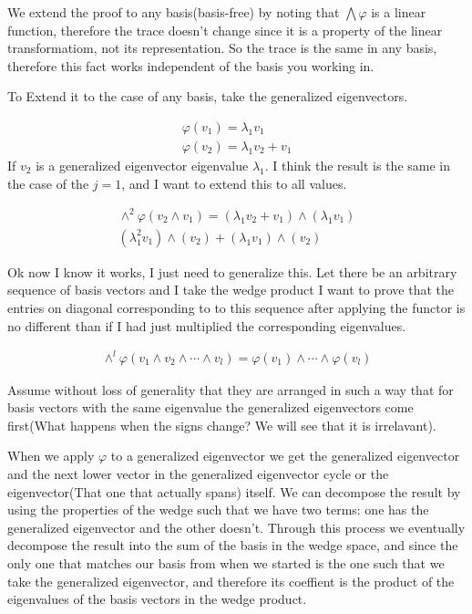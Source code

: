 \documentclass[11pt]{article}
\newcommand\0{\mathbf{0}}
\newcommand\<{\langle}
\renewcommand\>{\rangle}
\begin{document}
\begin{enumerate}
We extend the proof to any basis(basis-free) by noting that $\bigwedge \varphi$ is a linear function, therefore the 
trace doesn't change since it is a property of the linear transformatiom, not its representation. So the trace is the same in any basis,
therefore this fact works independent of the basis you working in.

To Extend it to the case of any basis, take the generalized eigenvectors.

\begin{align*}
	\varphi(v_{1})=\lambda_{1}v_{1}\\
	\varphi(v_{2})=\lambda_{1}v_{2}+v_{1}
\end{align*}
If $v_{2}$ is a generalized eigenvector eigenvalue $\lambda_{1}$. 
I think the result is the same in the case of the $j=1$, and I want to 
extend this to all values.

\begin{align*}
	\wedge^{2} \varphi(v_{2} \wedge v_{1}) = (\lambda_{1} v_{2} + v_{1}) \wedge (\lambda_{1} v_{1})\\
	(\lambda_{1}^{2} v_{1}) \wedge (v_{2}) + (\lambda_{1} v_{1}) \wedge (v_{2})
\end{align*}

Ok now I know it works, I just need to generalize this.
Let there be an arbitrary sequence of basis vectors and I take the wedge product I want to prove that
the entries on diagonal corresponding to to this sequence after applying the functor is no different than 
if I had just multiplied the corresponding eigenvalues.

\begin{align*}
	\wedge^{l} \varphi(v_{1} \wedge v_{2} \wedge \cdots \wedge v_{l}) = \varphi(v_{1}) \wedge \cdots \wedge \varphi(v_{l})
\end{align*}

Assume without loss of generality that they are arranged in such a way that for basis vectors with the
same eigenvalue the generalized eigenvectors come first(What happens when the signs change? We will see that it is irrelavant).

When we apply $\varphi$ to a generalized eigenvector we get the generalized eigenvector and the next lower vector in the 
generalized eigenvector cycle or the eigenvector(That one that actually spans) itself. We can decompose the 
result by using the properties of the wedge such that we have two terms: one has the generalized eigenvector and the 
other doesn't. Through this process we eventually decompose the result into the sum of the basis in the wedge space, and 
since the only one that matches our basis from when we started is the one such that we take the generalized eigenvector, and 
therefore its coeffient is the product of the eigenvalues of the basis vectors in the wedge product.


\end{enumerate}
\end{document}
